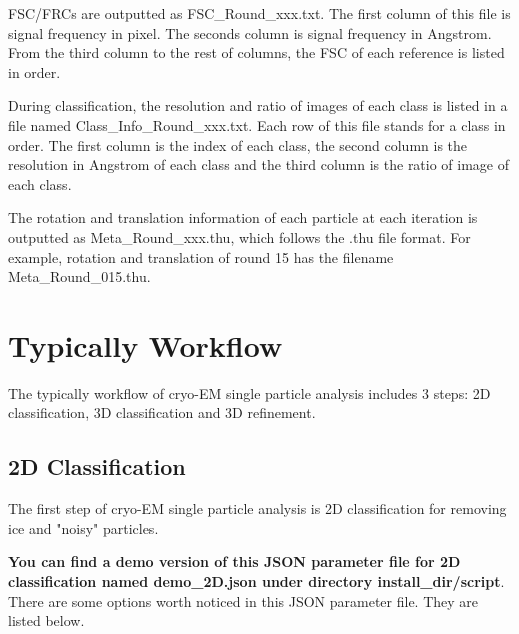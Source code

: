 \documentclass{article}
\begin{document}
        FSC/FRCs are outputted as \textsf{FSC\_Round\_xxx.txt}. The first column of this file is signal frequency in pixel. The seconds column is signal frequency in Angstrom. From the third column to the rest of columns, the FSC of each reference is listed in order.
        
        During classification, the resolution and ratio of images of each class is listed in a file named \textsf{Class\_Info\_Round\_xxx.txt}. Each row of this file stands for a class in order. The first column is the index of each class, the second column is the resolution in Angstrom of each class and the third column is the ratio of image of each class.

        The rotation and translation information of each particle at each iteration is outputted as \textsf{Meta\_Round\_xxx.thu}, which follows the \textsf{.thu} file format. For example, rotation and translation of round 15 has the filename \textsf{Meta\_Round\_015.thu}.
        
    \section{Typically Workflow}
    
        The typically workflow of cryo-EM single particle analysis includes 3 steps: 2D classification, 3D classification and 3D refinement. 
        
        \subsection{2D Classification}
        
        The first step of cryo-EM single particle analysis is 2D classification for removing ice and "noisy" particles.
        
        \textbf{You can find a demo version of this JSON parameter file for 2D classification named \textsf{demo\_2D.json} under directory \textsf{install\_dir/script}}. There are some options worth noticed in this JSON parameter file. They are listed below.
        
\end{document}
